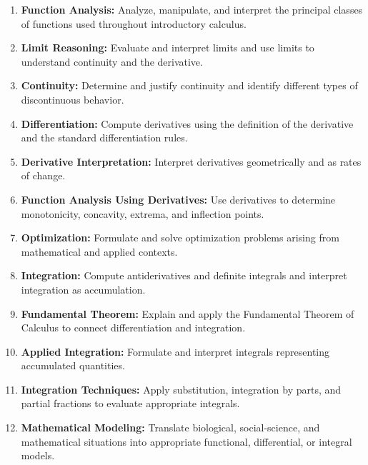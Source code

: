 \documentclass[11pt]{article}
\begin{document}
\begin{enumerate}
    \item \textbf{Function Analysis:}
    Analyze, manipulate, and interpret the principal classes of functions
    used throughout introductory calculus.

    \item \textbf{Limit Reasoning:}
    Evaluate and interpret limits and use limits to understand continuity and
    the derivative.

    \item \textbf{Continuity:}
    Determine and justify continuity and identify different types of
    discontinuous behavior.

    \item \textbf{Differentiation:}
    Compute derivatives using the definition of the derivative and the
    standard differentiation rules.

    \item \textbf{Derivative Interpretation:}
    Interpret derivatives geometrically and as rates of change.

    \item \textbf{Function Analysis Using Derivatives:}
    Use derivatives to determine monotonicity, concavity, extrema, and
    inflection points.

    \item \textbf{Optimization:}
    Formulate and solve optimization problems arising from mathematical and
    applied contexts.

    \item \textbf{Integration:}
    Compute antiderivatives and definite integrals and interpret integration
    as accumulation.

    \item \textbf{Fundamental Theorem:}
    Explain and apply the Fundamental Theorem of Calculus to connect
    differentiation and integration.

    \item \textbf{Applied Integration:}
    Formulate and interpret integrals representing accumulated quantities.

    \item \textbf{Integration Techniques:}
    Apply substitution, integration by parts, and partial fractions to
    evaluate appropriate integrals.

    \item \textbf{Mathematical Modeling:}
    Translate biological, social-science, and mathematical situations into
    appropriate functional, differential, or integral models.
\end{enumerate}
\end{document}
